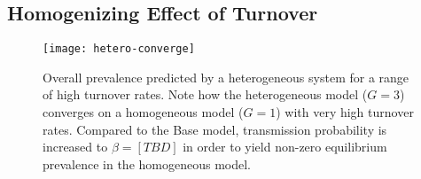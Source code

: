 \subsection{Homogenizing Effect of Turnover}\label{aa:homogenize}
\begin{figure}[H]
  \centering
  \texttt{[image: hetero-converge]}
  \caption{Overall prevalence predicted by a heterogeneous system
    for a range of high turnover rates.
    Note how the heterogeneous model ($G = 3$) converges on a homogeneous model ($G = 1$)
    with very high turnover rates.
    Compared to the Base model,
    transmission probability is increased to $\beta = [TBD]$
    in order to yield non-zero equilibrium prevalence in the homogeneous model.}
  \label{fig:hetero-converge}
\end{figure}
